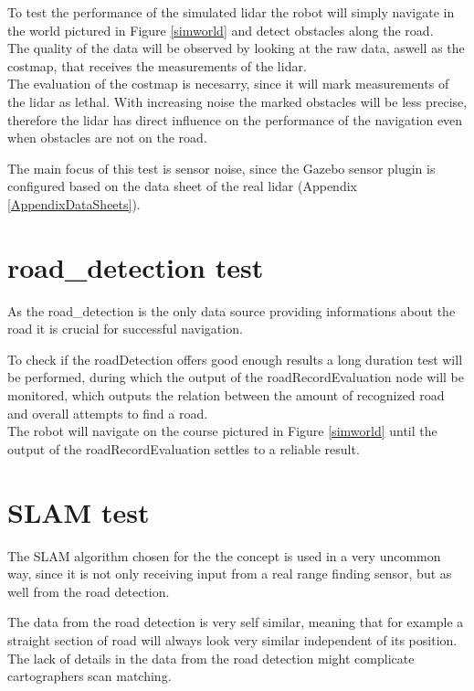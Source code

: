 To test the performance of the simulated lidar the robot will simply navigate in the world pictured in Figure \ref{simworld} and detect obstacles along the road.\\

The quality of the data will be observed by looking at the raw data, aswell as the costmap, that receives the measurements of the lidar.\\

The evaluation of the costmap is necesarry, since it will mark measurements of the lidar as lethal. With increasing noise the marked obstacles will be less precise, therefore the lidar has direct influence on the performance of the navigation even when obstacles are not on the road.

The main focus of this test is sensor noise, since the Gazebo sensor plugin is configured based on the data sheet of the real lidar (Appendix \ref{AppendixDataSheets}).

\section{road\_detection test}
As the road\_detection is the only data source providing informations about the road it is crucial for successful navigation.

To check if the roadDetection offers good enough results a long duration test will be performed, during which the output of the roadRecordEvaluation node will be monitored, which outputs the relation between the amount of recognized road and overall attempts to find a road.\\

The robot will navigate on the course pictured in Figure \ref{simworld} until the output of the roadRecordEvaluation settles to a reliable result.

\section{SLAM test}
The SLAM algorithm chosen for the the concept is used in a very uncommon way, since it is not only receiving input from a real range finding sensor, but as well from the road detection.

The data from the road detection is very self similar, meaning that for example a straight section of road will always look very similar independent of its position. The lack of details in the data from the road detection might complicate cartographers scan matching.\\

